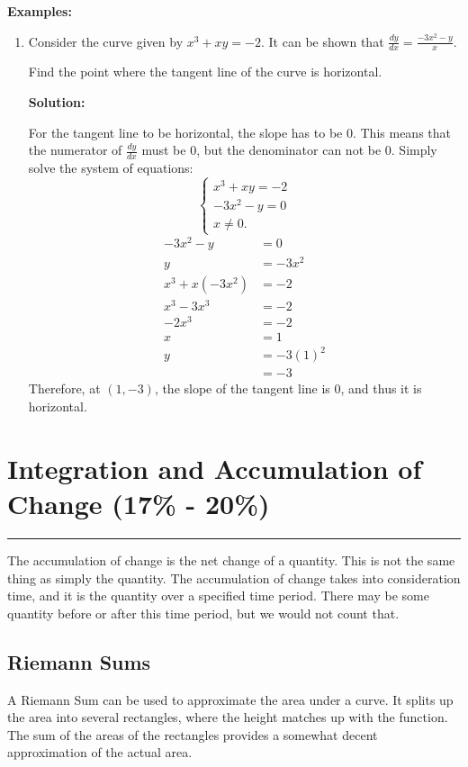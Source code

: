 \documentclass[12pt]{article}
\newcommand{\fline}{\par\noindent\rule{\textwidth}{0.1pt}} %
\begin{document}
\noindent \textbf{Examples:}
\begin{enumerate}
	\item Consider the curve given by $x^3 + xy = -2$. It can be shown that $\frac{dy}{dx} = \frac{-3x^2 - y}{x}$.

	      Find the point where the tangent line of the curve is horizontal.
	      \bigskip

	      \textbf{Solution:}

	      For the tangent line to be horizontal, the slope has to be $0$. This means that the numerator of $\frac{dy}{dx}$ must be $0$, but the denominator can not be $0$. Simply solve the system of equations:
	      \[ \begin{cases}
			      x^3 + xy = -2 \\
			      -3x^2 - y = 0 \\
			      x \ne 0.
		      \end{cases} \]
	      \begin{align*}
		      -3x^2 - y      & = 0       \\
		      y              & = -3x^2   \\[6pt]
		      x^3 + x(-3x^2) & = -2      \\
		      x^3 - 3x^3     & = -2      \\
		      -2x^3          & = -2      \\
		      x              & = 1       \\[6pt]
		      y              & = -3(1)^2 \\
		      & = -3
	      \end{align*}
	      Therefore, at $(1, -3)$, the slope of the tangent line is $0$, and thus it is horizontal.
\end{enumerate}

\section{Integration and Accumulation of Change (17\% - 20\%)}
\fline

The accumulation of change is the net change of a quantity. This is not the same thing as simply the quantity. The accumulation of change takes into consideration time, and it is the quantity over a specified time period. There may be some quantity before or after this time period, but we would not count that.

\subsection{Riemann Sums}
A Riemann Sum can be used to approximate the area under a curve. It splits up the area into several rectangles, where the height matches up with the function. The sum of the areas of the rectangles provides a somewhat decent approximation of the actual area.
\end{document}
